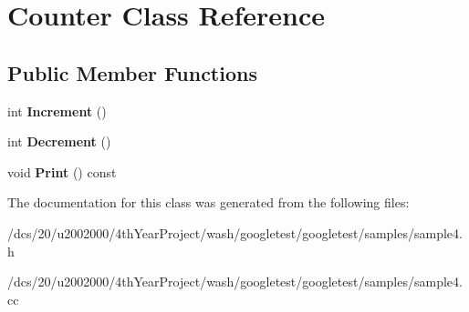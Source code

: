 \hypertarget{classCounter}{}\section{Counter Class Reference}
\label{classCounter}
\subsection*{Public Member Functions}
\begin{DoxyCompactItemize}
\item 
\mbox{\label{classCounter_a0a0ca9fdb580a2aec9a5a62ebed2b5ab}} 
int {\bfseries Increment} ()
\item 
\mbox{\label{classCounter_aa58d9b4f0bd96fc2331234493eb21bed}} 
int {\bfseries Decrement} ()
\item 
\mbox{\label{classCounter_a80092ec2a0deea0870b2e9f8ad0906bd}} 
void {\bfseries Print} () const
\end{DoxyCompactItemize}


The documentation for this class was generated from the following files\+:\begin{DoxyCompactItemize}
\item 
/dcs/20/u2002000/4th\+Year\+Project/wash/googletest/googletest/samples/sample4.\+h\item 
/dcs/20/u2002000/4th\+Year\+Project/wash/googletest/googletest/samples/sample4.\+cc\end{DoxyCompactItemize}
